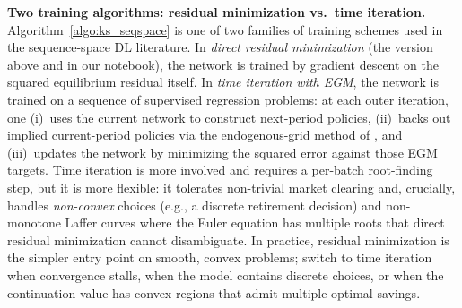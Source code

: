 \documentclass[11pt,a4paper]{report}
\begin{document}
\medskip\noindent\textbf{Two training algorithms: residual minimization vs.\ time iteration.}
Algorithm~\ref{algo:ks_seqspace} is one of two families of training schemes used in the sequence-space DL literature.  In \emph{direct residual minimization} (the version above and in our notebook), the network is trained by gradient descent on the squared equilibrium residual itself.  In \emph{time iteration with EGM}, the network is trained on a sequence of supervised regression problems: at each outer iteration, one (i)~uses the current network to construct next-period policies, (ii)~backs out implied current-period policies via the endogenous-grid method of \citet{carroll2006method}, and (iii)~updates the network by minimizing the squared error against those EGM targets.  Time iteration is more involved and requires a per-batch root-finding step, but it is more flexible: it tolerates non-trivial market clearing and, crucially, handles \emph{non-convex} choices (e.g., a discrete retirement decision) and non-monotone Laffer curves where the Euler equation has multiple roots that direct residual minimization cannot disambiguate.  In practice, residual minimization is the simpler entry point on smooth, convex problems; switch to time iteration when convergence stalls, when the model contains discrete choices, or when the continuation value has convex regions that admit multiple optimal savings.
\end{document}
